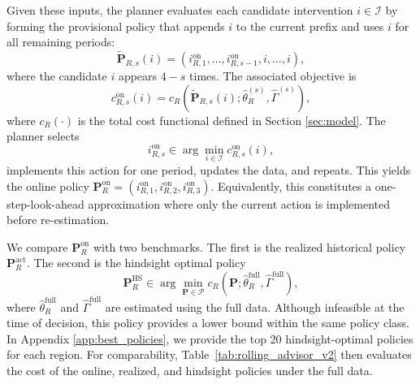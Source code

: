 \documentclass[msom,blindrev]{informs3} %
\begin{document}
{Given these inputs, the planner evaluates each candidate intervention $i\in\mathcal{I}$ by forming the provisional policy that appends $i$ to the current prefix and uses $i$ for all remaining periods:
\[
    \widetilde{\bm{P}}_{R,s}(i)
    =
    \left(i_{R,1}^{\mathrm{on}},\ldots,i_{R,s-1}^{\mathrm{on}},i,\ldots,i\right),
\]
where the candidate $i$ appears $4-s$ times. The associated objective is
\[
    c_{R,s}^{\mathrm{on}}(i)
    =
    c_R\!\left(\widetilde{\bm{P}}_{R,s}(i); \hat{\theta}_R^{(s)}, \hat{\Gamma}^{(s)}\right),
\]
where $c_R(\cdot)$ is the total cost functional defined in Section \ref{sec:model}. The planner selects
\[
    i_{R,s}^{\mathrm{on}}
    \in
    \arg\min_{i\in\mathcal{I}} c_{R,s}^{\mathrm{on}}(i),
\]
implements this action for one period, updates the data, and repeats. This yields the online policy $\bm{P}_R^{\mathrm{on}}=(i_{R,1}^{\mathrm{on}}, i_{R,2}^{\mathrm{on}}, i_{R,3}^{\mathrm{on}})$. Equivalently, this constitutes a one-step-look-ahead approximation where only the current action is implemented before re-estimation.

We compare $\bm{P}_R^{\mathrm{on}}$ with two benchmarks. The first is the realized historical policy $\bm{P}_R^{\mathrm{act}}$. The second is the hindsight optimal policy
\[
    \bm{P}_R^{\mathrm{HS}}
    \in
    \arg\min_{\bm{P}\in\mathcal{P}}
    c_R\!\left(\bm{P};\hat{\theta}_R^{\mathrm{full}},\hat{\Gamma}^{\mathrm{full}}\right),
\]
where $\hat{\theta}_R^{\mathrm{full}}$ and $\hat{\Gamma}^{\mathrm{full}}$ are estimated using the full data. Although infeasible at the time of decision, this policy provides a lower bound within the same policy class. In Appendix \ref{app:best_policies}, we provide the top 20 hindsight-optimal policies for each region. For comparability, Table~\ref{tab:rolling_advisor_v2} then evaluates the cost of the online, realized, and hindsight policies under the full data.

}
\end{document}
